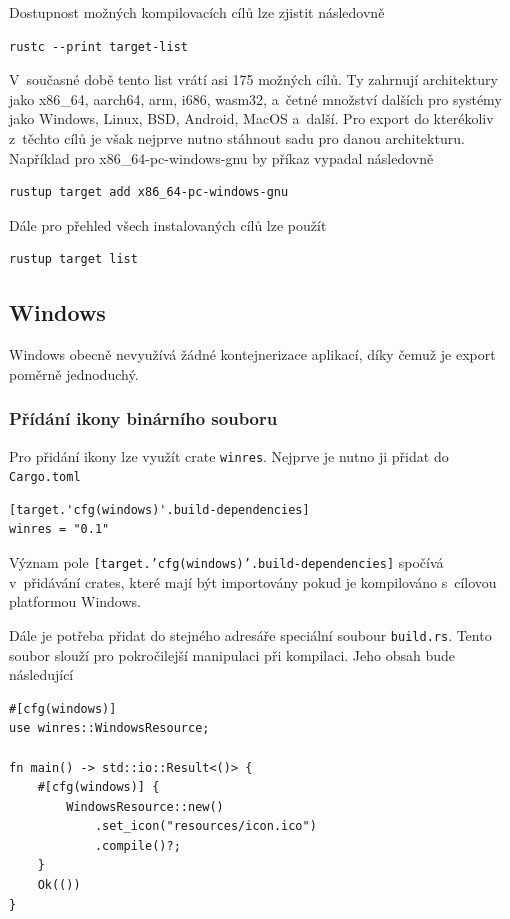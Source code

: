 \documentclass[a4paper, 12pt, twoside]{article} %
\begin{document}
	Dostupnost možných kompilovacích cílů lze zjistit následovně
	\begin{verbatim}
rustc --print target-list
	\end{verbatim}
		
	V~současné době tento list vrátí asi 175 možných cílů. Ty zahrnují architektury jako x86\_64, aarch64, arm, i686, wasm32, a~četné množství dalších pro systémy jako Windows, Linux, BSD, Android, MacOS a~další. Pro export do kterékoliv z~těchto cílů je však nejprve nutno stáhnout sadu pro danou architekturu. Například pro x86\_64-pc-windows-gnu by příkaz vypadal následovně
	\begin{verbatim}
rustup target add x86_64-pc-windows-gnu
	\end{verbatim}
	
	Dále pro přehled všech instalovaných cílů lze použít
	\begin{verbatim}
rustup target list
	\end{verbatim}

	\subsection{Windows}
	Windows obecně nevyužívá žádné kontejnerizace aplikací, díky čemuž je export poměrně jednoduchý.
	
	\subsubsection*{Přídání ikony binárního souboru}
		Pro přidání ikony lze využít crate \texttt{winres}. Nejprve je nutno ji přidat do \texttt{Cargo.toml}
		\begin{verbatim}
[target.'cfg(windows)'.build-dependencies]
winres = "0.1"
		\end{verbatim}
		
		Význam pole \texttt{[target.'cfg(windows)'.build-dependencies]} spočívá v~přidávání crates, které mají být importovány pokud je kompilováno s~cílovou platformou Windows.
		
		Dále je potřeba přidat do stejného adresáře speciální soubour \texttt{build.rs}. Tento soubor slouží pro pokročilejší manipulaci při kompilaci. Jeho obsah bude následující
		\begin{verbatim}
#[cfg(windows)]
use winres::WindowsResource;

fn main() -> std::io::Result<()> {
	#[cfg(windows)] {
		WindowsResource::new()
			.set_icon("resources/icon.ico")
			.compile()?;
	}
	Ok(())
}
		\end{verbatim}
\end{document}
